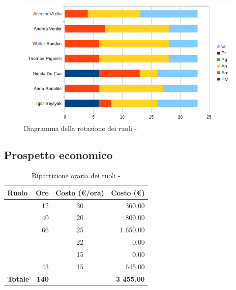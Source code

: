 \documentclass[12pt,a4paper]{article}
\begin{document}
\begin{center}
	\begin{figure}[H]
		\centering
		\includegraphics[width=\textwidth]{diagrammaBarreAnalisiRotazioneRuoli.png}
		\caption{Diagramma della rotazione dei ruoli - \FA}
	\end{figure}
\end{center}

\newpage
\subsection{Prospetto economico}

\begin{table}[H]
	\begin{center}
		\begin{tabular}{l r c r}
			\toprule
			\textbf{Ruolo}	& \textbf{Ore} & \textbf{Costo (\euro/ora)}	& \textbf{Costo (\euro)} \\
			\midrule
			\midrule
			\RE & 12 & 30 & 360.00\\
			\midrule
			\AM & 40 & 20 & 800.00\\ 
			\midrule
			\AN & 66 & 25 & 1 650.00\\ 
			\midrule
			\PG & & 22 & 0.00\\ 
			\midrule
			\PR & & 15 & 0.00\\ 
			\midrule
			\VR & 43 & 15 & 645.00\\ 
			\midrule
			\textbf{Totale} & \textbf{140} &  & \textbf{3 455.00}\\
			\bottomrule
		\end{tabular}
		\caption{Ripartizione oraria dei ruoli - \FA}
	\end{center}
\end{table}
\end{document}

